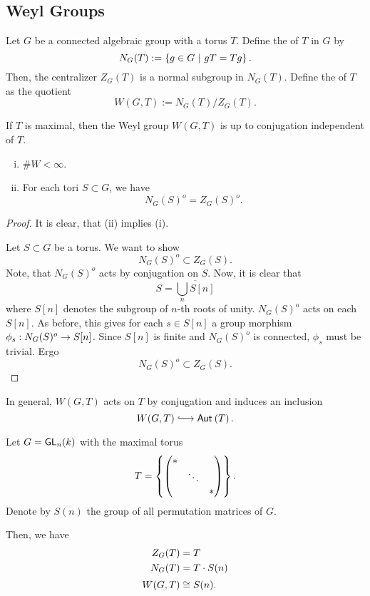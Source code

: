 \subsection{Weyl Groups}

\begin{definition}
	Let $G$ be a connected algebraic group with a torus $T$. Define the  of $T$ in $G$ by
	\[ N_G(T) := \left\lbrace g \in G ~ | ~ gT = Tg\right\rbrace. \]
	Then, the centralizer $Z_G(T)$ is a normal subgroup in $N_G(T)$. Define the  of $T$ as the quotient
	\[ W(G, T) := N_G(T) / Z_G(T).  \]
	
	If $T$ is maximal, then the Weyl group $W(G,T)$ is up to conjugation independent of $T$.
\end{definition}
\begin{proposition}
	\begin{enumerate}[(i)]
		\item $\# W < \infty$.
		\item For each tori $S \subset G$, we have
		\[ N_G(S)^o = Z_G(S)^o. \]
	\end{enumerate}
\end{proposition}
\begin{proof}
	It is clear, that (ii) implies (i).
	
	Let $S \subset G$ be a torus. We want to show
	\[ N_G(S)^o \subset Z_G(S). \]
	Note, that $N_G(S)^o$ acts by conjugation on $S$. Now, it is clear that
	\[ S = \overline{\bigcup_n S[n]} \]
	where $S[n]$ denotes the subgroup of $n$-th roots of unity.  $N_G(S)^o$ acts on each $S[n]$. As before, this gives for each $s \in S[n]$ a group morphism $\phi_s : N_G(S)^o \overset{}{\rightarrow} S[n]$. Since $S[n]$ is finite and $N_G(S)^o$ is connected, $\phi_s$ must be trivial. Ergo
	\[ N_G(S)^o \subset Z_G(S). \]
\end{proof}
\begin{remark}
	In general, $W(G,T)$ acts on $T$ by conjugation and induces an inclusion
	\[ W(G,T) \Inj{} \Aut{}{T}. \]
\end{remark}
\begin{example}
	Let $G = \textsf{GL}_n(k)$ with the maximal torus
	\[ T = \left\lbrace\left(\begin{matrix} * & & \\  & \ddots & \\ & & * \end{matrix}\right)\right\rbrace. \]
	Denote by $S(n)$ the group of all permutation matrices of $G$.
	
	Then, we have
	\begin{align*}
	Z_G(T) &= T\\
	N_G(T) &= T \cdot S(n)\\
	W(G,T) &\overset{}{\cong} S(n).
	\end{align*}
\end{example}